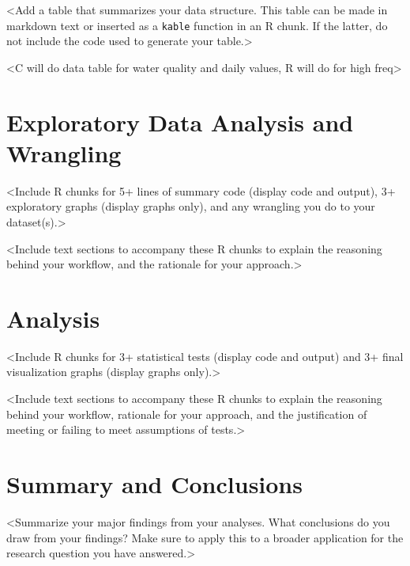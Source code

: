 \documentclass[12pt,]{article}
\begin{document}
\textless{}Add a table that summarizes your data structure. This table
can be made in markdown text or inserted as a \texttt{kable} function in
an R chunk. If the latter, do not include the code used to generate your
table.\textgreater{}

\textless{}C will do data table for water quality and daily values, R
will do for high freq\textgreater{}

\newpage

\hypertarget{exploratory-data-analysis-and-wrangling}{%
\section{Exploratory Data Analysis and
Wrangling}\label{exploratory-data-analysis-and-wrangling}}

\textless{}Include R chunks for 5+ lines of summary code (display code
and output), 3+ exploratory graphs (display graphs only), and any
wrangling you do to your dataset(s).\textgreater{}

\textless{}Include text sections to accompany these R chunks to explain
the reasoning behind your workflow, and the rationale for your
approach.\textgreater{}

\newpage

\hypertarget{analysis}{%
\section{Analysis}\label{analysis}}

\textless{}Include R chunks for 3+ statistical tests (display code and
output) and 3+ final visualization graphs (display graphs
only).\textgreater{}

\textless{}Include text sections to accompany these R chunks to explain
the reasoning behind your workflow, rationale for your approach, and the
justification of meeting or failing to meet assumptions of
tests.\textgreater{}

\newpage

\hypertarget{summary-and-conclusions}{%
\section{Summary and Conclusions}\label{summary-and-conclusions}}

\textless{}Summarize your major findings from your analyses. What
conclusions do you draw from your findings? Make sure to apply this to a
broader application for the research question you have
answered.\textgreater{}
\end{document}
